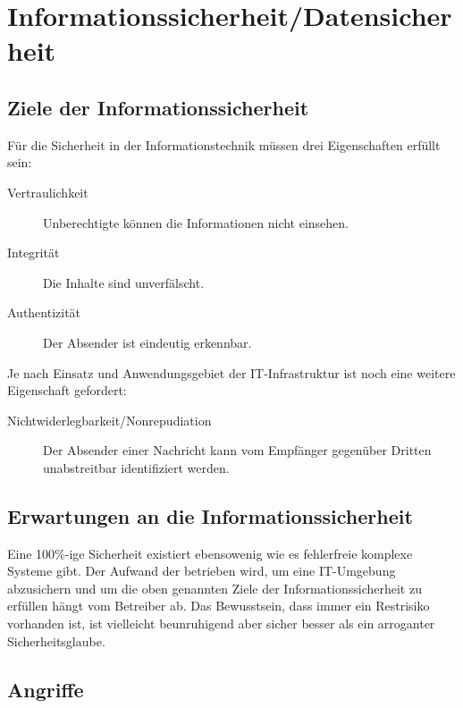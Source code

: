 \section{Informationssicherheit/Datensicherheit}
\label{sec:security}

\subsection{Ziele der Informationssicherheit}

Für die Sicherheit in der Informationstechnik müssen drei Eigenschaften erfüllt sein:

\begin{description}
    \item[Vertraulichkeit] Unberechtigte können die Informationen nicht einsehen.
    \item[Integrität] Die Inhalte sind unverfälscht.
    \item[Authentizität] Der Absender ist eindeutig erkennbar.
\end{description}

Je nach Einsatz und Anwendungsgebiet der IT-Infrastruktur ist noch eine
weitere Eigenschaft gefordert:

\begin{description}
    \item[Nichtwiderlegbarkeit/Nonrepudiation] Der Absender einer Nachricht
    kann vom Empfänger gegenüber Dritten unabstreitbar identifiziert werden.
\end{description}

\subsection{Erwartungen an die Informationssicherheit}

Eine 100\%-ige Sicherheit existiert ebensowenig wie es fehlerfreie komplexe
Systeme gibt. Der Aufwand der betrieben wird, um eine IT-Umgebung
abzusichern und um die oben genannten Ziele der Informationssicherheit
zu erfüllen hängt vom Betreiber ab. Das Bewusstsein, dass immer ein
Restrisiko vorhanden ist, ist vielleicht beunruhigend aber sicher besser
als ein arroganter Sicherheitsglaube.

\subsection{Angriffe}
\label{subsec:angriffe}

